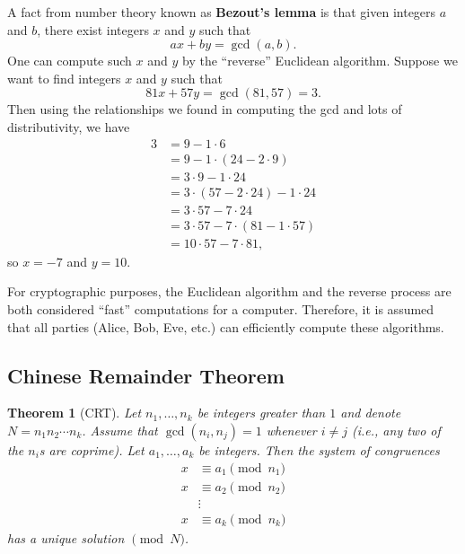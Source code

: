 \documentclass{article}
\newtheorem{theorem}{Theorem}%
\theoremstyle{definition}
\theoremstyle{remark}
\begin{document}
        A fact from number theory known as \textbf{Bezout's lemma} is that given integers \(a\) and \(b\), there exist integers \(x\) and \(y\) such that
        \[ax + by = \gcd(a,b).\]
        One can compute such \(x\) and \(y\) by the ``reverse'' Euclidean algorithm.
        Suppose we want to find integers \(x\) and \(y\) such that
        \[81x + 57y = \gcd(81,57) = 3.\]
        Then using the relationships we found in computing the gcd and lots of distributivity, we have
        \begin{align*}
            3 &= 9 - 1\cdot 6\\
            &= 9 - 1\cdot(24 - 2\cdot 9)\\
            &= 3\cdot 9 - 1\cdot 24\\
            &= 3\cdot(57 - 2\cdot 24) - 1\cdot 24\\ 
            &= 3\cdot 57 - 7\cdot 24\\
            &= 3\cdot 57 - 7\cdot (81 - 1\cdot 57)\\
            &= 10\cdot 57 - 7\cdot 81,
        \end{align*}
        so \(x = -7\) and \(y=10\).

        For cryptographic purposes, the Euclidean algorithm and the reverse process are both considered ``fast'' computations for a computer.
        Therefore, it is assumed that all parties (Alice, Bob, Eve, etc.) can efficiently compute these algorithms.

    \subsection{Chinese Remainder Theorem}

        \begin{theorem}[CRT]
            Let \(n_1,\ldots,n_k\) be integers greater than \(1\) and denote \(N=n_1n_2\cdots n_k\).
            Assume that \(\gcd(n_i,n_j)=1\) whenever \(i\neq j\) (i.e., any two of the \(n_i\)s are coprime).
            Let \(a_1,\ldots,a_k\) be integers.
            Then the system of congruences
            \begin{align*}
                x &\equiv a_1\pmod{n_1}\\
                x &\equiv a_2\pmod{n_2}\\
                &\vdots\\
                x &\equiv a_k\pmod{n_k}
            \end{align*}
            has a unique solution \(\pmod{N}\).
        \end{theorem}
\end{document}
